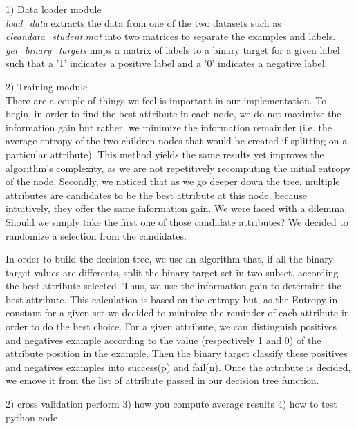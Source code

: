 
1) Data loader module\\
\emph{load\_data} extracts the data from one of the two datasets
such as \emph{cleandata\_student.mat} into two matrices to separate the examples and labels. \\
\emph{get\_binary\_targets} maps a matrix of labels to a binary target for a given label
such that a '1' indicates a positive label and a '0' indicates a negative label.

2) Training module \\
There are a couple of things we feel is important in our implementation.
To begin, in order to find the best attribute in each node, we do not maximize the information gain
but rather, we minimize the information remainder (i.e. the average entropy of the two children nodes
that would be created if splitting on a particular attribute). This method yields the same results yet
improves the algorithm's complexity, as we are not repetitively recomputing the initial entropy of the node.
Secondly, we noticed that as we go deeper down the tree, multiple attributes are candidates to be the best attribute
at this node, because intuitively, they offer the same information gain. We were faced with a dilemma. Should we simply
take the first one of those candidate attributes? We decided to randomize a selection from the candidates.


In order to build the decision tree, we use an algorithm that, if all the binary-target values are differents, split the binary target set in two subset, according the best attribute selected. Thus, we use the information gain to determine the best attribute. This calculation is based on the entropy but, as the Entropy in constant for a given set we decided to minimize the reminder of each attribute in order to do the best choice. For a given attribute, we can distinguish positives and negatives example according to the value (respectively 1 and 0) of the attribute position in the example. Then the binary target classify these positives and negatives examples into success(p) and fail(n). Once the attribute is decided, we emove it from the list of attribute passed in our decision tree function.

2) cross validation perform
3) how you compute average results
4) how to test python code

